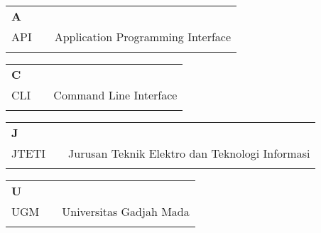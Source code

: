\singkatan
\noindent

\begin{tabular}{p{20pt}p{3pt}l}
\textbf{A}\\
API & & Application Programming Interface\\
\\
\end{tabular}

\begin{tabular}{p{20pt}p{3pt}l}
\textbf{C}\\
CLI & & Command Line Interface\\
\\
\end{tabular}

\begin{tabular}{p{20pt}p{3pt}l}
\textbf{J}\\
JTETI & & Jurusan Teknik Elektro dan Teknologi Informasi\\
\\
\end{tabular}

\begin{tabular}{p{20pt}p{3pt}l}
\textbf{U}\\
UGM & & Universitas Gadjah Mada\\
\\
\end{tabular}